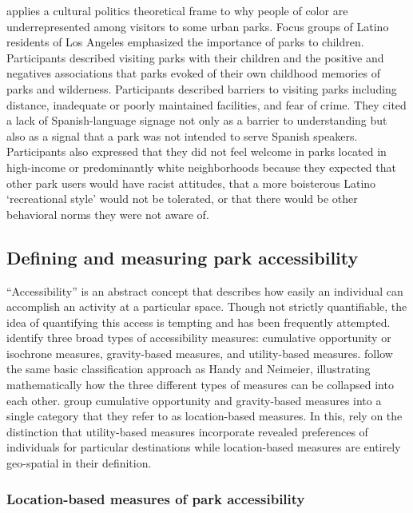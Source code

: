 \documentclass[3p, authoryear, review, doubleblind]{elsarticle} %
\begin{document}
\citet{byrne2012green} applies a cultural politics theoretical frame to why people of
color are underrepresented among visitors to some urban parks. Focus groups of
Latino residents of Los Angeles emphasized the importance of parks to
children. Participants described visiting parks with their children and the
positive and negatives associations that parks evoked of their own childhood
memories of parks and wilderness. Participants described barriers to visiting
parks including distance, inadequate or poorly maintained facilities, and fear
of crime. They cited a lack of Spanish-language signage not only as a barrier
to understanding but also as a signal that a park was not intended to serve
Spanish speakers. Participants also expressed that they did not feel welcome
in parks located in high-income or predominantly white neighborhoods because
they expected that other park users would have racist attitudes, that a more
boisterous Latino `recreational style' would not be tolerated, or that there
would be other behavioral norms they were not aware of.

\hypertarget{defining-and-measuring-park-accessibility}{%
\subsection{Defining and measuring park accessibility}\label{defining-and-measuring-park-accessibility}}

``Accessibility'' is an abstract concept that describes how easily an individual
can accomplish an activity at a particular space. Though not strictly
quantifiable, the idea of quantifying this access is tempting and has been
frequently attempted. \citet{Handy1997} identify three broad types of accessibility
measures: cumulative opportunity or isochrone measures, gravity-based measures,
and utility-based measures. \citet{Dong2006} follow the same basic classification
approach as Handy and Neimeier, illustrating mathematically how the three
different types of measures can be collapsed into each other. \citet{GEURS2004127}
group cumulative opportunity and gravity-based measures into a single category
that they refer to as location-based measures. In this, \citet{GEURS2004127} rely on
the distinction that utility-based measures incorporate revealed preferences of
individuals for particular destinations while location-based measures are
entirely geo-spatial in their definition.

\hypertarget{location-based-measures-of-park-accessibility}{%
\subsubsection{Location-based measures of park accessibility}\label{location-based-measures-of-park-accessibility}}
\end{document}
